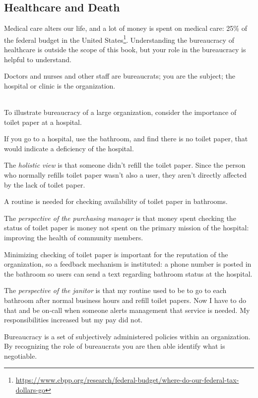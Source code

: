 \subsection*{Healthcare and Death\label{sec:bureaucracy-of-death}}
Medical care alters our life, and a lot of money is spent on medical care: 25\% of the federal budget in the United States\footnote{\href{https://www.cbpp.org/research/federal-budget/where-do-our-federal-tax-dollars-go}{https://www.cbpp.org/research/federal-budget/where-do-our-federal-tax-dollars-go}}. Understanding the bureaucracy of healthcare is outside the scope of this book, but your role in the bureaucracy is helpful to understand.

Doctors and nurses and other staff are bureaucrats; you are the subject; the hospital or clinic is the organization. 

\ \\
To illustrate bureaucracy of a large organization, consider the importance of toilet paper at a hospital. 
\begin{mdframed}
If you go to a hospital, use the bathroom, and find there is no toilet paper, that would indicate a deficiency of the hospital.

The \textit{holistic view} is that someone didn't refill the toilet paper. Since the person who normally refills toilet paper wasn't also a user, they aren't directly affected by the lack of toilet paper.

A routine is needed for checking availability of toilet paper in bathrooms. 

The \textit{perspective of the purchasing manager} is that money spent checking the status of toilet paper is money not spent on the primary mission of the hospital: improving the health of community members.

Minimizing checking of toilet paper is important for the reputation of the organization, so a feedback mechanism is instituted: a phone number is posted in the bathroom so users can send a text regarding bathroom status at the hospital.

The \textit{perspective of the janitor} is that my routine used to be to go to each bathroom after normal business hours and refill toilet papers. Now I have to do that and be on-call when someone alerts management that service is needed. My responsibilities increased but my pay did not.

\end{mdframed}






Bureaucracy is a set of subjectively administered policies within an organization. By recognizing the role of bureaucrats you are then able identify what is negotiable. 
